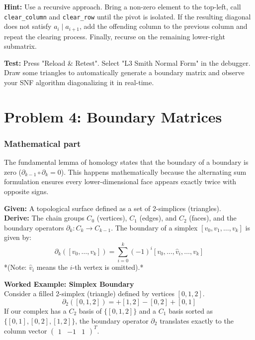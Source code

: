 \documentclass[11pt]{article}
\begin{document}
\textbf{Hint:} Use a recursive approach. Bring a non-zero element to the top-left, call \lstinline|clear_column| and \lstinline|clear_row| until the pivot is isolated. If the resulting diagonal does not satisfy $a_i \mid a_{i+1}$, add the offending column to the previous column and repeat the clearing process. Finally, recurse on the remaining lower-right submatrix.

\textbf{Test:} Press "Reload \& Retest". Select "L3 Smith Normal Form" in the debugger. Draw some triangles to automatically generate a boundary matrix and observe your SNF algorithm diagonalizing it in real-time.






\section*{Problem 4: Boundary Matrices}

\subsubsection*{Mathematical part}
The fundamental lemma of homology states that the boundary of a boundary is zero ($\partial_{k-1} \circ \partial_k = 0$). This happens mathematically because the alternating sum formulation ensures every lower-dimensional face appears exactly twice with opposite signs.

\textbf{Given:} A topological surface defined as a set of 2-simplices (triangles). \\
\textbf{Derive:} The chain groups $C_0$ (vertices), $C_1$ (edges), and $C_2$ (faces), and the boundary operators $\partial_k : C_k \to C_{k-1}$. The boundary of a simplex $[v_0, v_1, \dots, v_k]$ is given by:
$$ \partial_k([v_0, \dots, v_k]) = \sum_{i=0}^k (-1)^i [v_0, \dots, \hat{v}_i, \dots, v_k] $$
*(Note: $\hat{v}_i$ means the $i$-th vertex is omitted).*

\vspace{0.5cm}
\noindent\textbf{Worked Example: Simplex Boundary} \\
Consider a filled 2-simplex (triangle) defined by vertices $[0, 1, 2]$.
$$ \partial_2([0, 1, 2]) = +[1, 2] - [0, 2] + [0, 1] $$
If our complex has a $C_2$ basis of $\{ [0, 1, 2] \}$ and a $C_1$ basis sorted as $\{ [0,1], [0,2], [1,2] \}$, the boundary operator $\partial_2$ translates exactly to the column vector $\begin{pmatrix} 1 & -1 & 1 \end{pmatrix}^T$.
\end{document}
